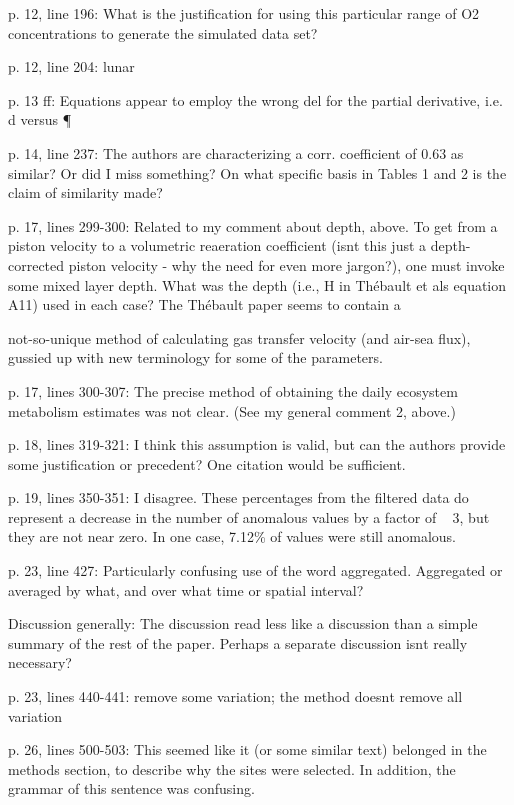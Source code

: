 \documentclass[letterpaper,12pt]{article}\usepackage[]{graphicx}\usepackage[]{color}
\begin{document}
p. 12, line 196: What is the justification for using this particular range of O2 concentrations to generate the simulated data set?

p. 12, line 204: lunar

p. 13 ff: Equations appear to employ the wrong del for the partial derivative, i.e. d versus ¶

p. 14, line 237: The authors are characterizing a corr. coefficient of 0.63 as similar? Or did I
miss something? On what specific basis in Tables 1 and 2 is the claim of similarity made?

p. 17, lines 299-300: Related to my comment about depth, above. To get from a piston velocity
to a volumetric reaeration coefficient (isnt this just a depth-corrected piston velocity - why the need for even more jargon?), one must invoke some mixed layer depth. What was the depth (i.e., H in Thébault et als equation A11) used in each case? The Thébault paper seems to contain a
 
not-so-unique method of calculating gas transfer velocity (and air-sea flux), gussied up with new terminology for some of the parameters.

p. 17, lines 300-307: The precise method of obtaining the daily ecosystem metabolism estimates was not clear. (See my general comment 2, above.)

p. 18, lines 319-321: I think this assumption is valid, but can the authors provide some justification or precedent? One citation would be sufficient.

p. 19, lines 350-351: I disagree. These percentages from the filtered data do represent a decrease
in the number of anomalous values by a factor of ~ 3, but they are not near zero. In one case,
7.12\% of values were still anomalous.

p. 23, line 427: Particularly confusing use of the word aggregated. Aggregated or averaged by
what, and over what time or spatial interval?

Discussion generally: The discussion read less like a discussion than a simple summary of the rest of the paper. Perhaps a separate discussion isnt really necessary?

p. 23, lines 440-441: remove some variation; the method doesnt remove all variation

p. 26, lines 500-503: This seemed like it (or some similar text) belonged in the methods section, to describe why the sites were selected. In addition, the grammar of this sentence was confusing.
\end{document}
